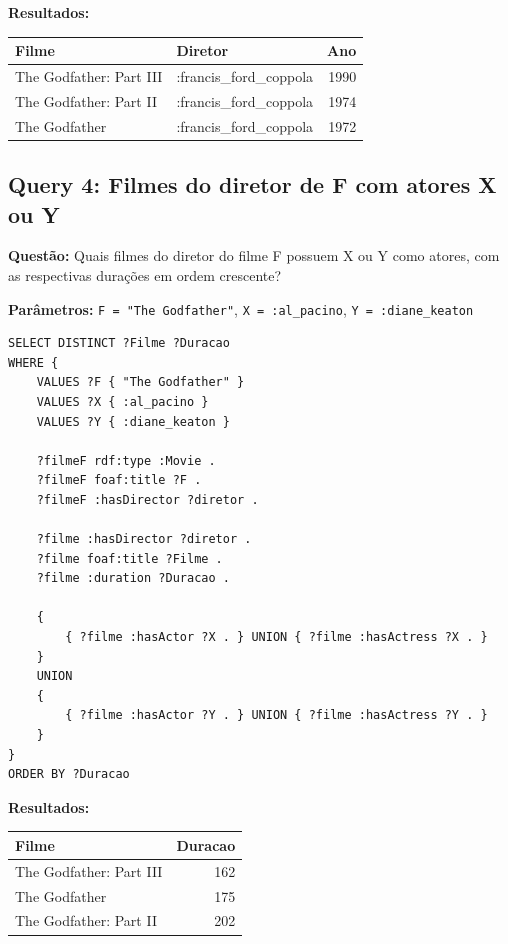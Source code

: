 \documentclass[12pt,a4paper]{article}
\begin{document}
\textbf{Resultados:}

\begin{table}[H]
\centering
\begin{tabular}{|l|l|r|}
\hline
\textbf{Filme} & \textbf{Diretor} & \textbf{Ano} \\
\hline
The Godfather: Part III & :francis\_ford\_coppola & 1990 \\
\hline
The Godfather: Part II & :francis\_ford\_coppola & 1974 \\
\hline
The Godfather & :francis\_ford\_coppola & 1972 \\
\hline
\end{tabular}
\end{table}
\newpage
\subsection{Query 4: Filmes do diretor de F com atores X ou Y}

\textbf{Questão:} Quais filmes do diretor do filme F possuem X ou Y como atores, com as respectivas durações em ordem crescente?

\textbf{Parâmetros:} \texttt{F = "The Godfather"}, \texttt{X = :al\_pacino}, \texttt{Y = :diane\_keaton}

\begin{lstlisting}
SELECT DISTINCT ?Filme ?Duracao
WHERE {
    VALUES ?F { "The Godfather" }
    VALUES ?X { :al_pacino }
    VALUES ?Y { :diane_keaton }
    
    ?filmeF rdf:type :Movie .
    ?filmeF foaf:title ?F .
    ?filmeF :hasDirector ?diretor .
    
    ?filme :hasDirector ?diretor .
    ?filme foaf:title ?Filme .
    ?filme :duration ?Duracao .
    
    {
        { ?filme :hasActor ?X . } UNION { ?filme :hasActress ?X . }
    }
    UNION
    {
        { ?filme :hasActor ?Y . } UNION { ?filme :hasActress ?Y . }
    }
}
ORDER BY ?Duracao
\end{lstlisting}

\textbf{Resultados:}

\begin{table}[H]
\centering
\begin{tabular}{|l|r|}
\hline
\textbf{Filme} & \textbf{Duracao} \\
\hline
The Godfather: Part III & 162 \\
\hline
The Godfather & 175 \\
\hline
The Godfather: Part II & 202 \\
\hline
\end{tabular}
\end{table}
\newpage
\end{document}

